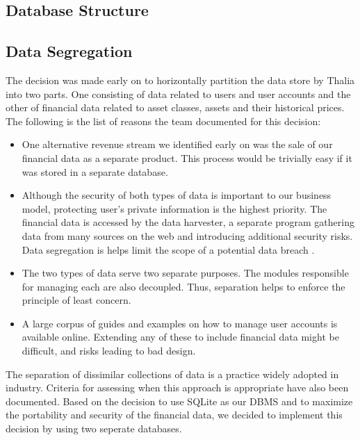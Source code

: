 \documentclass[main.tex]{subfiles}
\begin{document}

\subsection{Database Structure}
\label{DB Structure}

\subsection{Data Segregation}

The decision was made early on to horizontally partition the data store by Thalia into two parts. One consisting of data related to users and user accounts and the other of financial data related to asset classes, assets and their historical prices. The following is the list of reasons the team documented for this decision:

\begin{itemize}

\item One alternative revenue stream we identified early on was the sale of our financial data as a separate product. This process would be trivially easy if it was stored in a separate database. 
\item Although the security of both types of data is important to our business model, protecting user’s private information is the highest priority. The financial data is accessed by the data harvester, a separate program gathering data from many sources on the web and introducing additional security risks. Data segregation is helps limit the scope of a potential data breach \cite{ciscoSeg}.
\item The two types of data serve two separate purposes. The modules responsible for managing each are also decoupled. Thus, separation helps to enforce the principle of least concern.
\item A large corpus of guides and examples on how to manage user accounts is available online. Extending any of these to include financial data might be difficult, and risks leading to bad design.

\end{itemize}

The separation of dissimilar collections of data is a practice widely adopted in industry. Criteria for assessing when this approach is appropriate have also been documented. \cite{dataSegImp} Based on the decision to use SQLite as our DBMS and to maximize the portability and security of the financial data, we decided to implement this decision by using two seperate databases.
\end{document}
